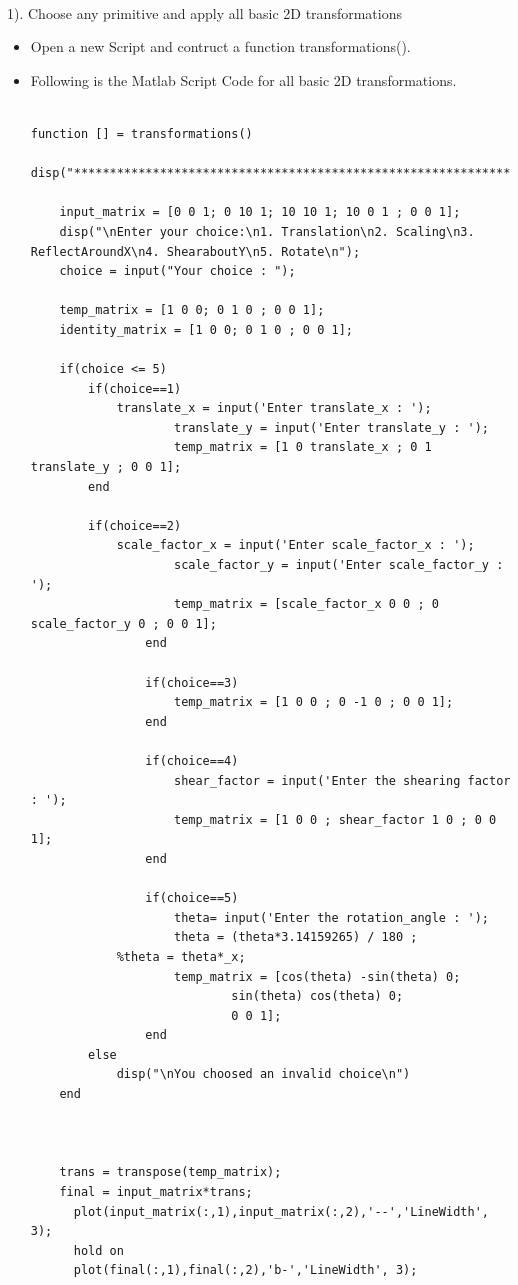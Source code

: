 \\

1). Choose any primitive and apply all basic 2D transformations

\begin{itemize}

\item Open a new Script and contruct a function transformations().
\item Following is the Matlab Script Code for all basic 2D transformations.
\begin{lstlisting}

function [] = transformations()
	disp("**************************************************************************")
	
	input_matrix = [0 0 1; 0 10 1; 10 10 1; 10 0 1 ; 0 0 1];
	disp("\nEnter your choice:\n1. Translation\n2. Scaling\n3. ReflectAroundX\n4. ShearaboutY\n5. Rotate\n");
	choice = input("Your choice : ");
	
	temp_matrix = [1 0 0; 0 1 0 ; 0 0 1];
	identity_matrix = [1 0 0; 0 1 0 ; 0 0 1];

	if(choice <= 5)
		if(choice==1)
			translate_x = input('Enter translate_x : ');
            		translate_y = input('Enter translate_y : ');
            		temp_matrix = [1 0 translate_x ; 0 1 translate_y ; 0 0 1];
		end

		if(choice==2)
			scale_factor_x = input('Enter scale_factor_x : ');
            		scale_factor_y = input('Enter scale_factor_y : ');
            		temp_matrix = [scale_factor_x 0 0 ; 0 scale_factor_y 0 ; 0 0 1];
            	end

            	if(choice==3)
            		temp_matrix = [1 0 0 ; 0 -1 0 ; 0 0 1];
            	end

            	if(choice==4)
            		shear_factor = input('Enter the shearing factor : ');
            		temp_matrix = [1 0 0 ; shear_factor 1 0 ; 0 0 1];
            	end

            	if(choice==5)
            		theta= input('Enter the rotation_angle : ');
            		theta = (theta*3.14159265) / 180 ;
			%theta = theta*_x;
            		temp_matrix = [cos(theta) -sin(theta) 0;
            				sin(theta) cos(theta) 0;
            				0 0 1];
            	end
        else
        	disp("\nYou choosed an invalid choice\n")
	end

	 

 	trans = transpose(temp_matrix);
 	final = input_matrix*trans;
      plot(input_matrix(:,1),input_matrix(:,2),'--','LineWidth', 3);
      hold on
      plot(final(:,1),final(:,2),'b-','LineWidth', 3);
\end{lstlisting}
\end{itemize}

